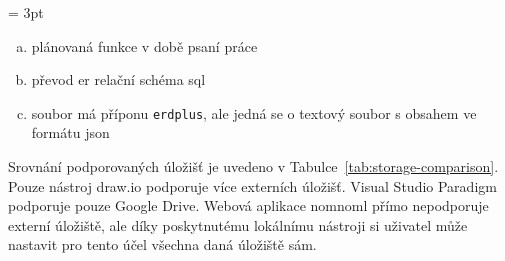 \begin{table}[htb]
  \renewcommand{\arraystretch}{1.5}
  \begin{center}
    \sffamily
    \tabcolsep = 3pt\relax
    \footnotesize
  \end{center}

  \footnotesize
  \begin{enumerate}[a.,ref = \alph*,noitemsep]
    \item plánovaná funkce v době psaní práce\label{tab:fc:plan}
    \item převod \acrshort{er} \rightarrow{} relační schéma \rightarrow{} \acrshort{sql}\label{tab:fc:erdplus-sql}
    \item soubor má příponu \texttt{erdplus}, ale jedná se o textový soubor s obsahem ve formátu \acrshort{json}\label{tab:fc:erdplus-json}
  \end{enumerate}

  \caption{Exportované formáty existujících řešení}
  \label{tab:format-comparison}
\end{table}

Srovnání podporovaných úložišť je uvedeno v Tabulce~\ref{tab:storage-comparison}.
Pouze nástroj draw.io podporuje více externích úložišť.
Visual Studio Paradigm podporuje pouze Google Drive.
Webová aplikace nomnoml přímo nepodporuje externí úložiště, ale díky poskytnutému lokálnímu nástroji si uživatel může nastavit pro tento účel všechna daná úložiště sám.

